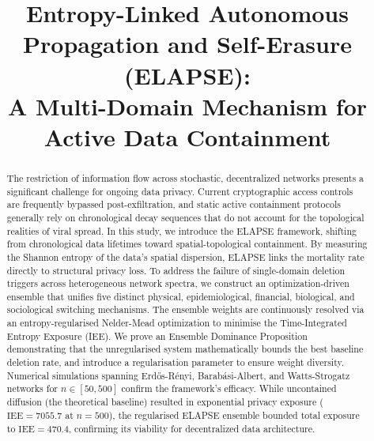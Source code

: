 \documentclass[conference]{IEEEtran}
\begin{document}
\title{Entropy-Linked Autonomous Propagation and Self-Erasure (ELAPSE):\\
A Multi-Domain Mechanism for Active Data Containment}

\author{
\and
{}
\and
{}
\and
{}
}

\maketitle

\begin{abstract}
The restriction of information flow across stochastic, decentralized networks presents
a significant challenge for ongoing data privacy. Current cryptographic access controls
are frequently bypassed post-exfiltration, and static active containment protocols
generally rely on chronological decay sequences that do not account for the topological
realities of viral spread. In this study, we introduce the ELAPSE framework, shifting
from chronological data lifetimes toward spatial-topological containment. By measuring
the Shannon entropy of the data's spatial dispersion, ELAPSE links the mortality rate
directly to structural privacy loss. To address the failure of single-domain deletion
triggers across heterogeneous network spectra, we construct an optimization-driven
ensemble that unifies five distinct physical, epidemiological, financial, biological, and
sociological switching mechanisms. The ensemble weights are continuously resolved via an
entropy-regularised Nelder-Mead optimization to minimise the Time-Integrated Entropy
Exposure (IEE). We prove an Ensemble Dominance Proposition demonstrating that the
unregularised system mathematically bounds the best baseline deletion rate, and introduce
a regularisation parameter to ensure weight diversity. Numerical simulations spanning
Erd\H{o}s-R\'{e}nyi, Barab\'{a}si-Albert, and Watts-Strogatz networks for
$n \in [50, 500]$ confirm the framework's efficacy. While uncontained diffusion (the
theoretical baseline) resulted in exponential privacy exposure ($\mathrm{IEE} = 7055.7$
at $n = 500$), the regularised ELAPSE ensemble bounded total exposure to
$\mathrm{IEE} = 470.4$, confirming its viability for decentralized data architecture.
\end{abstract}
\end{document}
